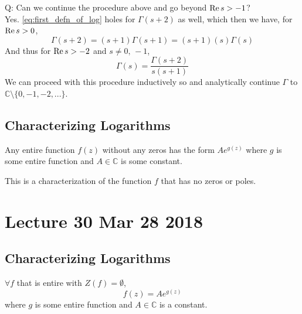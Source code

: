 \documentclass[notoc,notitlepage]{tufte-book}
\begin{document}
Q: Can we continue the procedure above and go beyond $\operatorname{Re}{s} > -1$? \\
Yes. \cref{eq:first_defn_of_log} holes for $\Gamma(s + 2)$ as well, which then
we have, for $\operatorname{Re}{s} > 0$,
\begin{equation*}
  \Gamma(s + 2) = (s + 1) \Gamma(s + 1) = (s + 1) (s) \Gamma(s)
\end{equation*}
And thus for $\operatorname{Re}{s} > -2$ and $s \neq 0, \, -1$,
\begin{equation*}
  \Gamma(s) = \frac{\Gamma(s + 2)}{s (s + 1)}
\end{equation*}
We can proceed with this procedure inductively so and analytically continue $\Gamma$ to $\mathbb{C} \setminus \{0, -1, -2, ...\}$.


\section{Characterizing Logarithms} %

\begin{thm*}[Theorem 18]
  Any entire function $f(z)$ without any zeros has the form $Ae^{g(z)}$ where $g$ is some entire function and $A \in \mathbb{C}$ is some constant.
\end{thm*}

This is a characterization of the function $f$ that has no zeros or poles.



\chapter{Lecture 30 Mar 28 2018}
  \label{chapter:lecture_30_mar_28_2018}

\section{Characterizing Logarithms} %
\label{sec:characterizing_logarithms}

\begin{thm}[Theorem 18]\label{thm:theorem_18}
  $\forall f$ that is entire with $Z(f) = \emptyset$,
  \begin{equation*}
    f(z) = Ae^{g(z)}
  \end{equation*}
  where $g$ is some entire function and $A \in \mathbb{C}$ is a constant.
\end{thm}
\end{document}
